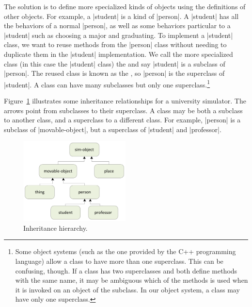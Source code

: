 \begin{schemeregion}
The solution is to define more specialized kinds of objects using the definitions of other objects.  For example, a \scheme|student| is a kind of \scheme|person|. A \scheme|student| has all the behaviors of a normal \scheme|person|, as well as some behaviors particular to a \scheme|student| such as choosing a major and graduating.  To implement a \scheme|student| class, we want to reuse methods from the \scheme|person| class without needing to duplicate them in the \scheme|student| implementation.  We call the more specialized class (in this case the \scheme|student| class) the  and say \scheme|student| is a subclass of \scheme|person|.  The reused class is known as the , so \scheme|person| is the superclass of \scheme|student|.  A class can have many subclasses but only one superclass.\footnote{Some object systems (such as the one provided by the C++ programming language) allow a class to have more than one superclass.  This can be confusing, though.  If a class has two superclasses and both define methods with the same name, it may be ambiguous which of the methods is used when it is invoked on an object of the subclass.  In our object system, a class may have only one superclass.}  

Figure~\ref{fig-inheritance} illustrates some inheritance relationships for a university simulator.  The arrows point from subclasses to their superclass.  A class may be both a subclass to another class, and a superclass to a different class.  For example, \scheme|person| is a subclass of \scheme|movable-object|, but a superclass of \scheme|student| and \scheme|professor|.  

\begin{figure}[bth]
\begin{center}
\includegraphics[width=2.2in]{figures/inheritance.png}
\caption{Inheritance hierarchy.}\label{fig-inheritance}
\end{center}
\end{figure}


\end{schemeregion}
